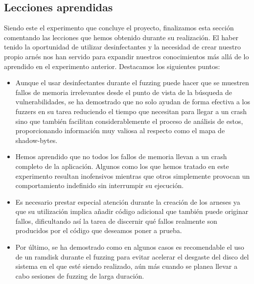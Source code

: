 \subsection{Lecciones aprendidas}
Siendo este el experimento que concluye el proyecto, finalizamos esta sección comentando las lecciones que hemos obtenido durante su realización. El haber
tenido la oportunidad de utilizar desinfectantes y la necesidad de crear nuestro propio arnés nos han servido para expandir nuestros conocimientos más allá
de lo aprendido en el experimento anterior. Destacamos los siguientes puntos:
\begin{itemize}
    \item Aunque el usar desinfectantes durante el fuzzing puede hacer que se muestren fallos de memoria irrelevantes desde el punto de vista de la búsqueda 
    de vulnerabilidades, se ha demostrado que no solo ayudan de forma efectiva a los fuzzers en su tarea reduciendo el tiempo que necesitan para llegar a un 
    crash sino que también facilitan considerablemente el proceso de análisis de estos, proporcionando información muy valiosa al respecto como el mapa de 
    shadow-bytes.
    \item Hemos aprendido que no todos los fallos de memoria llevan a un crash completo de la aplicación. Algunos como los que hemos tratado en este experimento
    resultan inofensivos mientras que otros simplemente provocan un comportamiento indefinido sin interrumpir su ejecución.
    \item Es necesario prestar especial atención durante la creación de los arneses ya que su utilización implica añadir código adicional que también puede
    originar fallos, dificultando así la tarea de discernir qué fallos realmente son producidos por el código que deseamos poner a prueba.
    \item Por último, se ha demostrado como en algunos casos es recomendable el uso de un ramdisk durante el fuzzing para evitar acelerar el desgaste del
    disco del sistema en el que esté siendo realizado, aún más cuando se planea llevar a cabo sesiones de fuzzing de larga duración.
\end{itemize}